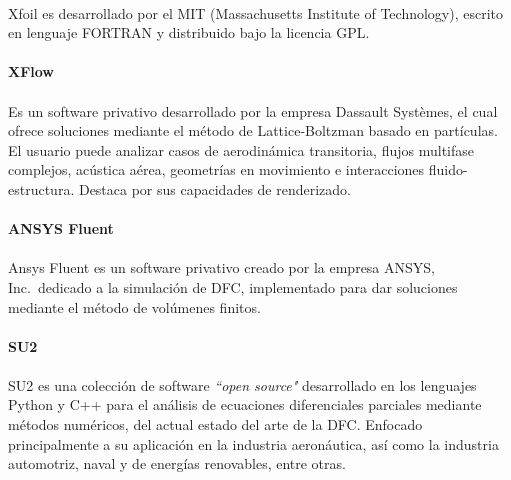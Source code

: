 \documentclass[letterpaper, openright, 12pt]{book}
\begin{document}
				\paragraph*{}
					Xfoil es desarrollado por el MIT (Massachusetts Institute of
                    Technology), escrito en lenguaje FORTRAN y distribuido bajo
                    la licencia GPL.

				\paragraph*{XFlow}
				\paragraph*{}
					Es un software privativo desarrollado por la empresa
                    Dassault Systèmes, el cual ofrece soluciones mediante el
                    método de Lattice-Boltzman basado en partículas. El usuario
                    puede analizar casos de aerodinámica transitoria, flujos
                    multifase complejos, acústica aérea, geometrías en
                    movimiento e interacciones fluido-estructura. Destaca por
                    sus capacidades de renderizado.\cite{xflow}
				
				\paragraph*{ANSYS Fluent}
				\paragraph*{}
				Ansys Fluent es un software privativo creado por la empresa
                ANSYS, Inc.\ dedicado a la simulación de DFC, implementado
                para dar soluciones mediante el método de volúmenes finitos.
					
				\paragraph*{SU2}
				\paragraph*{}
				SU2 es una colección de software \textit{``open source"}
                desarrollado en los lenguajes Python y C++ para el análisis de
                ecuaciones diferenciales parciales mediante métodos numéricos,
                del actual estado del arte de la DFC\@. Enfocado principalmente a
                su aplicación en la industria aeronáutica, así como la industria
                automotriz, naval y de energías renovables, entre otras.\cite{SU2}
\end{document}
